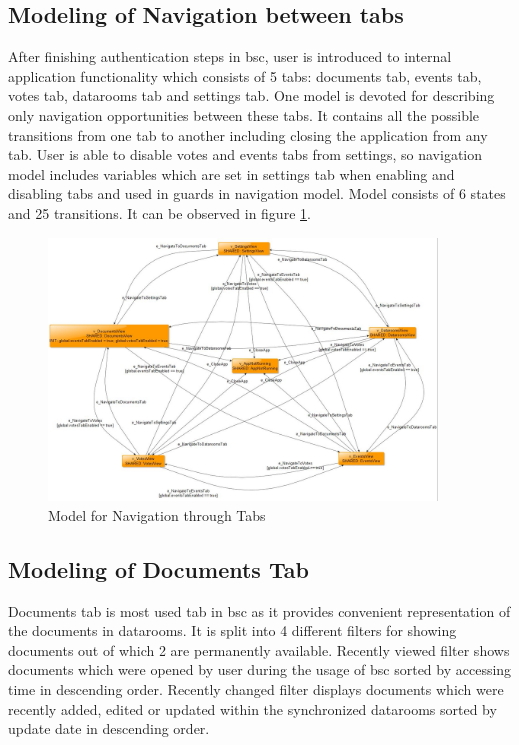 \subsection{Modeling of Navigation between tabs}
\par
After finishing authentication steps in \acrshort{bsc}, user is introduced to internal application functionality which consists of 5 tabs: documents tab, events tab, votes tab, datarooms tab and settings tab. One model is devoted for describing only navigation opportunities between these tabs. It contains all the possible transitions from one tab to another including closing the application from any tab. User is able to disable votes and events tabs from settings, so navigation model includes variables which are set in settings tab when enabling and disabling tabs and used in guards in navigation model. Model consists of 6 states and 25 transitions. It can be observed in figure \ref{Fig:Navigation_Model_Screenshot}.

\begin{figure} [htbp!]
	\centering
					\includegraphics[width=0.92\textwidth]{figures/Navigation_model_screenshot}
					\caption{\label{Fig:Navigation_Model_Screenshot} Model for Navigation through Tabs}
\end{figure}

\subsection{Modeling of Documents Tab}
\par
Documents tab is most used tab in \acrshort{bsc} as it provides convenient representation of the documents in datarooms. It is split into 4 different filters for showing documents out of which 2 are permanently available. Recently viewed filter shows documents which were opened by user during the usage of \acrshort{bsc} sorted by accessing time in descending order. Recently changed filter displays documents which were recently added, edited or updated within the synchronized datarooms sorted by update date in descending order.

